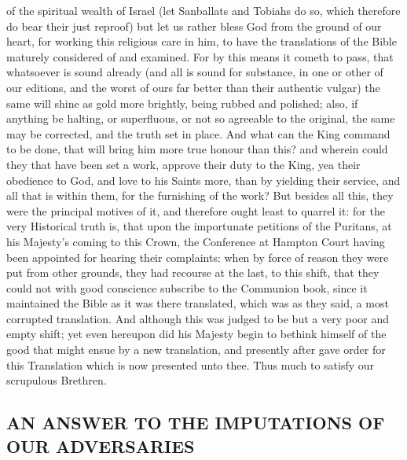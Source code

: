of the spiritual wealth of Israel (let Sanballats and Tobiahs do so, which therefore do bear their just reproof) but let us rather bless God from the ground of our heart, for working this religious care in him, to have the translations of the Bible maturely considered of and examined. For by this means it cometh to pass, that whatsoever is sound already (and all is sound for substance, in one or other of our editions, and the worst of ours far better than their authentic vulgar) the same will shine as gold more brightly, being rubbed and polished; also, if anything be halting, or superfluous, or not so agreeable to the original, the same may be corrected, and the truth set in place. And what can the King command to be done, that will bring him more true honour than this? and wherein could they that have been set a work, approve their duty to the King, yea their obedience to God, and love to his Saints more, than by yielding their service, and all that is within them, for the furnishing of the work? But besides all this, they were the principal motives of it, and therefore ought least to quarrel it: for the very Historical truth is, that upon the importunate petitions of the Puritans, at his Majesty's coming to this Crown, the Conference at Hampton Court having been appointed for hearing their complaints: when by force of reason they were put from other grounds, they had recourse at the last, to this shift, that they could not with good conscience subscribe to the Communion book, since it maintained the Bible as it was there translated, which was as they said, a most corrupted translation. And although this was judged to be but a very poor and empty shift; yet even hereupon did his Majesty begin to bethink himself of the good that might ensue by a new translation, and presently after gave order for this Translation which is now presented unto thee. Thus much to satisfy our scrupulous Brethren.

\subsection{AN ANSWER TO THE IMPUTATIONS OF OUR ADVERSARIES}

